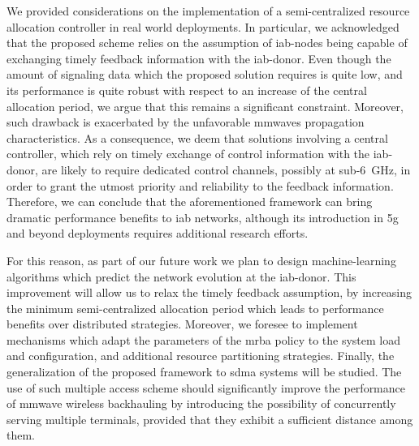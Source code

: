 We provided considerations on the implementation of a semi-centralized resource allocation controller in real world deployments. In particular, we acknowledged that the proposed scheme relies on the assumption of \gls{iab}-nodes being capable of exchanging timely feedback information with the \gls{iab}-donor. Even though the amount of signaling data which the proposed solution requires is quite low, and its performance is quite robust with respect to an increase of the central allocation period, we argue that this remains a significant constraint. Moreover, such drawback is exacerbated by the unfavorable \glspl{mmwave} propagation characteristics.
As a consequence, we deem that solutions involving a central controller, which rely on timely exchange of control information with the \gls{iab}-donor, are likely to require dedicated control channels, possibly at sub-6~{GHz}, in order to grant the utmost priority and reliability to the feedback information. Therefore, we can conclude that the aforementioned framework can bring dramatic performance benefits to \gls{iab} networks, although its introduction in \gls{5g} and beyond deployments requires additional research efforts.

For this reason, as part of our future work we plan to design machine-learning algorithms which predict the network evolution at the \gls{iab}-donor. This improvement will allow us to relax the timely feedback assumption, by increasing the minimum semi-centralized allocation period which leads to performance benefits over distributed strategies. 
Moreover, we foresee to implement mechanisms which adapt the parameters of the \gls{mrba} policy to the system load and configuration, and additional resource partitioning strategies. 
Finally, the generalization of the proposed framework to \gls{sdma} systems will be studied. 
The use of such multiple access scheme should significantly improve the performance of \gls{mmwave} wireless backhauling by introducing the possibility of concurrently serving multiple terminals, provided that they exhibit a sufficient distance among them.


